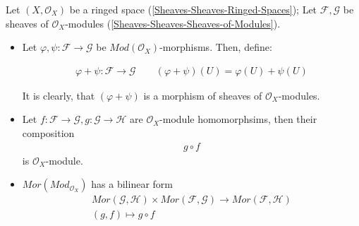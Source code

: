 \documentclass[Total.tex]{subfiles}
\begin{document}
		\begin{Def}
			Let $(X,\mathcal{O}_X)$ be a ringed space (\ref{Sheaves-Sheaves-Ringed-Spaces}); Let $\mathcal{F},\mathcal{G}$ be sheaves of $\mathcal{O}_X$-modules (\ref{Sheaves-Sheaves-Sheaves-of-Modules}). 
			
			\begin{itemize}
				\item Let $\varphi,\psi:\mathcal{F}\rightarrow \mathcal{G}$ be $Mod(\mathcal{O}_X)$-morphisms. Then, define:
				
				\begin{gather*}
					\varphi+\psi:\mathcal{F}\rightarrow \mathcal{G}\qquad (\varphi+\psi)(U)=\varphi(U)+\psi(U)
				\end{gather*}
				
				It is clearly, that $(\varphi+\psi)$ is a morphism of sheaves of $\mathcal{O}_X$-modules. 
				
				
				\item Let $f:\mathcal{F}\rightarrow \mathcal{G},g:\mathcal{G}\rightarrow \mathcal{H}$ are $\mathcal{O}_X$-module homomorphsims, then their composition
				\begin{gather*}
					g\circ f
				\end{gather*}
				is $\mathcal{O}_X$-module.
				\item $Mor(Mod_{\mathcal{O}_X})$ has a bilinear form
				\begin{gather*}
					Mor(\mathcal{G},\mathcal{H})\times Mor(\mathcal{F},\mathcal{G})\rightarrow Mor(\mathcal{F},\mathcal{H})\\
					(g,f)\mapsto g\circ f
				\end{gather*} 
			\end{itemize}
		\end{Def}
\end{document}
